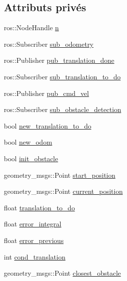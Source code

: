 \subsection*{Attributs privés}
\begin{DoxyCompactItemize}
\item 
ros\+::\+Node\+Handle \hyperlink{classtranslation__action_a778b85167923da6ca704d6acfa7947ed}{n}
\item 
ros\+::\+Subscriber \hyperlink{classtranslation__action_ae6cf88e1a84564744bc11d0973b10cd5}{sub\+\_\+odometry}
\item 
ros\+::\+Publisher \hyperlink{classtranslation__action_a8e07db9c45af311e71fe1927b6aeb424}{pub\+\_\+translation\+\_\+done}
\item 
ros\+::\+Subscriber \hyperlink{classtranslation__action_aeb8895ac2cc5a98f5f10e28ebc2117e6}{sub\+\_\+translation\+\_\+to\+\_\+do}
\item 
ros\+::\+Publisher \hyperlink{classtranslation__action_a1a4a9e78d808b6d86ca8f59a510b7639}{pub\+\_\+cmd\+\_\+vel}
\item 
ros\+::\+Subscriber \hyperlink{classtranslation__action_af307cb9a0696fcefff6665f9332ddb7e}{sub\+\_\+obstacle\+\_\+detection}
\item 
bool \hyperlink{classtranslation__action_ac46c0be691bf4f3a281dc5295718a672}{new\+\_\+translation\+\_\+to\+\_\+do}
\item 
bool \hyperlink{classtranslation__action_aeb14a0c0ae0c7b25150d20752b587c3c}{new\+\_\+odom}
\item 
bool \hyperlink{classtranslation__action_a27a6e128fa79d4e87a4d28f5fcb163dc}{init\+\_\+obstacle}
\item 
geometry\+\_\+msgs\+::\+Point \hyperlink{classtranslation__action_aa8774a6f4dbbab014e9c8672ee048f7f}{start\+\_\+position}
\item 
geometry\+\_\+msgs\+::\+Point \hyperlink{classtranslation__action_ab631cf920d18e691fcafb05c5d014baf}{current\+\_\+position}
\item 
float \hyperlink{classtranslation__action_a5811a9d811697668e153543dfaf1d2d0}{translation\+\_\+to\+\_\+do}
\item 
float \hyperlink{classtranslation__action_a08c753f34a47c55ae61a7e2f1533b3cf}{error\+\_\+integral}
\item 
float \hyperlink{classtranslation__action_aa3ac2f4fc74779444d7dcf4c6b92ec11}{error\+\_\+previous}
\item 
int \hyperlink{classtranslation__action_a421febcf8951d829dc2d6f1087cc1fc5}{cond\+\_\+translation}
\item 
geometry\+\_\+msgs\+::\+Point \hyperlink{classtranslation__action_a3057bf4271e7198ad8ded2daf07f8f4e}{closest\+\_\+obstacle}
\end{DoxyCompactItemize}


